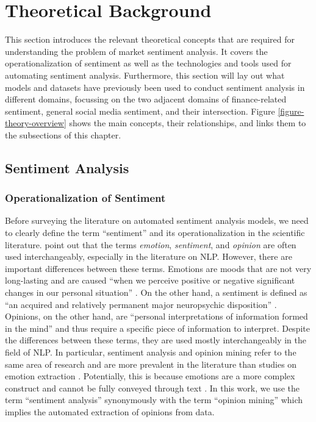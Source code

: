 \section{Theoretical Background}
This section introduces the relevant theoretical concepts that are required for understanding the problem of market sentiment analysis. It covers the operationalization of sentiment as well as the technologies and tools used for automating sentiment analysis. Furthermore, this section will lay out what models and datasets have previously been used to conduct sentiment analysis in different domains, focussing on the two adjacent domains of finance-related sentiment, general social media sentiment, and their intersection. Figure \ref{figure-theory-overview} shows the main concepts, their relationships, and links them to the subsections of this chapter.



\subsection{Sentiment Analysis}
\label{section-sa}
\subsubsection{Operationalization of Sentiment}
Before surveying the literature on automated sentiment analysis models, we need to clearly define the term ``sentiment'' and its operationalization in the scientific literature.  point out that the terms \emph{emotion}, \emph{sentiment}, and \emph{opinion} are often used interchangeably, especially in the literature on NLP. However, there are important differences between these terms. Emotions are moods that are not very long-lasting and are caused ``when we perceive positive or negative significant changes in our personal situation'' . On the other hand, a sentiment is defined as ``an acquired and relatively permanent major neuropsychic disposition'' \cite[p.~16]{cattell1940sentiment}. Opinions, on the other hand, are ``personal interpretations of information formed in the mind'' \cite[p.~4]{munezero2014they} and thus require a specific piece of information to interpret. Despite the differences between these terms, they are used mostly interchangeably in the field of NLP. In particular, sentiment analysis and opinion mining refer to the same area of research \cite{liu2012book} and are more prevalent in the literature than studies on emotion extraction . Potentially, this is because emotions are a more complex construct and cannot be fully conveyed through text . In this work, we use the term ``sentiment analysis'' synonymously with the term ``opinion mining'' which implies the automated extraction of opinions from data.

